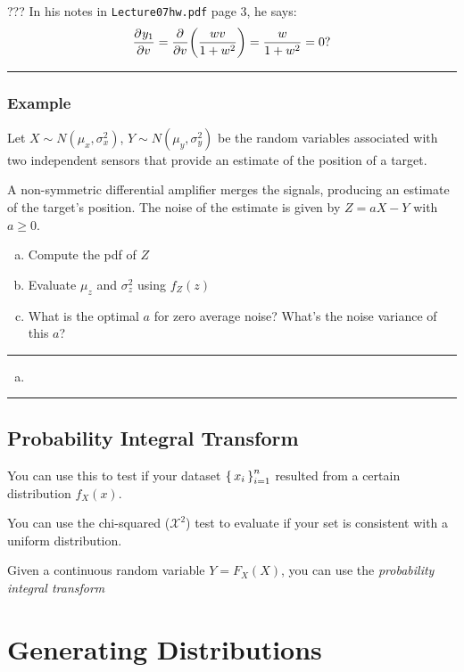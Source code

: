 \documentclass{report}
\newcommand{\var}{\sigma^2}
\newcommand{\ex}{\noindent\rule{\linewidth}{0.2pt}}
\newcommand{\deriv}[3][]{
  \ensuremath{\frac{\partial^{#1} {#2}}{\partial {#3}^{#1}}}}
\DeclarePairedDelimiter\autobracket{(}{)}
\newcommand{\br}[1]{\autobracket*{#1}}
\begin{document}
??? In his notes in \texttt{Lecture07hw.pdf} page 3, he says:  $$
\deriv{y_1}{v} = \deriv{}{v} \br{\frac{wv}{1+w^2}} = \frac{w}{1+w^2} = 0?
$$

\ex
\subsubsection*{Example}

Let $X \sim N(\mu_x, \var_x)$, $Y \sim N(\mu_y, \var_y)$ be the random variables associated with two independent sensors that provide an estimate of the position of a target.

A non-symmetric differential amplifier merges the signals, producing an estimate of the target's position. The noise of the estimate is given by $Z = aX-Y$ with $a \geq 0$. \begin{enumerate}[(a)]
\item Compute the pdf of $Z$
\item Evaluate $\mu_z$ and $\var_z$ using $f_Z(z)$
\item What is the optimal $a$ for zero average noise? What's the noise variance of this $a$?
\end{enumerate}

\ex

\begin{enumerate}[(a)]
\item 
\end{enumerate}

\ex

\subsection{Probability Integral Transform}

You can use this to test if your dataset $\set{x_i}_{i=1}^n$ resulted from a certain distribution $f_X(x)$.

You can use the chi-squared ($\mathcal{X}^2$) test to evaluate if your set is consistent with a uniform distribution. 

Given a continuous random variable $Y = F_X(X)$, you can use the \textit{probability integral transform}









\section{Generating Distributions}
\end{document}
